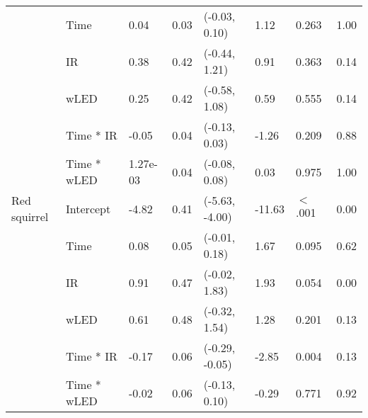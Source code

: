 \begin{table}[ht]
\begin{tabular}{lllllllr}
   & Time & 0.04 & 0.03 & (-0.03,  0.10) & 1.12 & 0.263  & 1.00 \\ 
   & IR & 0.38 & 0.42 & (-0.44,  1.21) & 0.91 & 0.363  & 0.14 \\ 
   & wLED & 0.25 & 0.42 & (-0.58,  1.08) & 0.59 & 0.555  & 0.14 \\ 
   & Time * IR & -0.05 & 0.04 & (-0.13,  0.03) & -1.26 & 0.209  & 0.88 \\ 
   & Time * wLED & 1.27e-03 & 0.04 & (-0.08,  0.08) & 0.03 & 0.975  & 1.00 \\ 
  Red squirrel & Intercept & -4.82 & 0.41 & (-5.63, -4.00) & -11.63 & $<$ .001 & 0.00 \\ 
   & Time & 0.08 & 0.05 & (-0.01,  0.18) & 1.67 & 0.095  & 0.62 \\ 
   & IR & 0.91 & 0.47 & (-0.02,  1.83) & 1.93 & 0.054  & 0.00 \\ 
   & wLED & 0.61 & 0.48 & (-0.32,  1.54) & 1.28 & 0.201  & 0.13 \\ 
   & Time * IR & -0.17 & 0.06 & (-0.29, -0.05) & -2.85 & 0.004  & 0.13 \\ 
   & Time * wLED & -0.02 & 0.06 & (-0.13,  0.10) & -0.29 & 0.771  & 0.92 \\ 
   \hline
\end{tabular}
\end{table}
